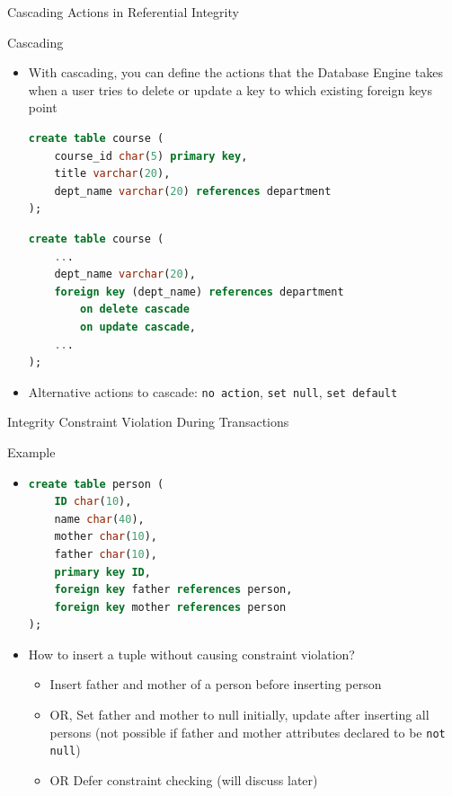 \documentclass[aspectratio=169, xcolor=dvipsnames]{beamer}
\begin{document}
\begin{frame}[fragile]{Cascading Actions in Referential Integrity}
    \begin{block}{Cascading}
        \begin{itemize}[<+->]
            \item With cascading, you can define the actions that the Database Engine takes when a user tries to delete or update a key to which existing foreign keys point
            \begin{lstlisting}[language=SQL, basicstyle=\ttfamily\scriptsize]
create table course (
    course_id char(5) primary key, 
    title varchar(20), 
    dept_name varchar(20) references department
);
            \end{lstlisting}
            \vspace{0.2em}
            \begin{lstlisting}[language=SQL, basicstyle=\ttfamily\scriptsize]
create table course (
    ...
    dept_name varchar(20), 
    foreign key (dept_name) references department 
        on delete cascade 
        on update cascade,
    ...
);
            \end{lstlisting}
            \item Alternative actions to cascade: \texttt{no action}, \texttt{set null}, \texttt{set default}
        \end{itemize}
    \end{block}
\end{frame}

\begin{frame}[fragile]{Integrity Constraint Violation During Transactions}
    \begin{exampleblock}{Example}
        \begin{itemize}[<+->]
            \item \begin{lstlisting}[language=SQL, basicstyle=\ttfamily\scriptsize]
create table person ( 
    ID char(10), 
    name char(40), 
    mother char(10), 
    father char(10), 
    primary key ID, 
    foreign key father references person, 
    foreign key mother references person
);
            \end{lstlisting}
            \item How to insert a tuple without causing constraint violation?
            \begin{itemize}
                \item[$\triangleright$] Insert father and mother of a person before inserting person
                \item[$\triangleright$] OR, Set father and mother to null initially, update after inserting all persons (not possible if father and mother attributes declared to be \texttt{not null})
                \item[$\triangleright$] OR Defer constraint checking (will discuss later)
            \end{itemize}
        \end{itemize}
    \end{exampleblock}
\end{frame}
\end{document}
